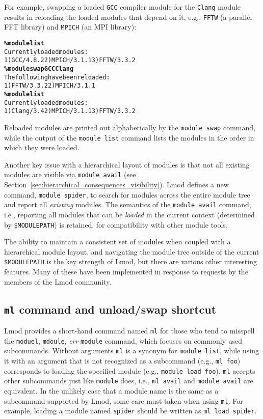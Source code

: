 For example, swapping a loaded \texttt{\small GCC} compiler module for the
\texttt{\small {Clang}} module results in reloading the loaded modules that
depend on it, e.g., \texttt{\small FFTW} (a parallel FFT library) and
\texttt{\small MPICH} (an MPI library):
{\small
  \begin{alltt}
    \textbf{\% module list}
    Currently loaded modules:
    1) GCC/4.8.2  2) MPICH/3.1.1  3) FFTW/3.3.2
    \textbf{\% module swap GCC Clang}
    The following have been reloaded:
    1) FFTW/3.3.2  2) MPICH/3.1.1
    \textbf{\% module list}
    Currently loaded modules:
    1) Clang/3.4  2) MPICH/3.1.1  3) FFTW/3.3.2
\end{alltt}
}
\noindent
Reloaded modules are printed out
alphabetically by the \texttt{\small module swap} command, while the output of
the \texttt{\small module list} command lists the modules in the order in which
they were loaded.


Another key issue with a hierarchical layout of modules is that not all
existing modules are visible via \texttt{\small module avail} (see
Section~\ref{sec:hierarchical_consequences_visibility}). Lmod defines a
new command, \texttt{\small module spider}, to search for modules across the
entire module tree and report all \emph{existing} modules. The semantics of
the \texttt{\small module avail} command, i.e., reporting all modules that can
be \emph{loaded} in the current context (determined by
\texttt{\small \$MODULEPATH}) is retained, for compatibility with other module
tools.

The ability to maintain a consistent set of modules when coupled with a
hierarchical module layout, and navigating the module tree outside of the
current \texttt{\small \$MODULEPATH} is the key strength of Lmod, but there are
various other interesting features.  Many of these have been implemented in
response to requests by the members of the Lmod community.

\subsection{\texttt{\small ml} command and unload/swap shortcut}

Lmod provides a short-hand command named \texttt{\small ml} for those who tend to
misspell the \texttt{\small moduel}, \texttt{\small mdoule}, \emph{err}
\texttt{\small module} command, which focuses on
commonly used subcommands. Without arguments \texttt{\small ml} is a synonym for
\texttt{\small module list}, while using it with an argument that is not
recognized as a subcommand (e.g., \texttt{\small ml foo}) corresponds to loading
the specified module (e.g., \texttt{\small module load foo}).
\texttt{\small ml} accepts other subcommands just like \texttt{\small module} does,
i.e., \texttt{\small ml avail} and \texttt{\small module avail} are equivalent.
In the unlikely case that a module name is the same as a subcommand supported by Lmod, 
some care must taken when using \texttt{\small ml}. For example, loading a module
named \texttt{\small spider} should be written as \texttt{\small ml load spider}.

